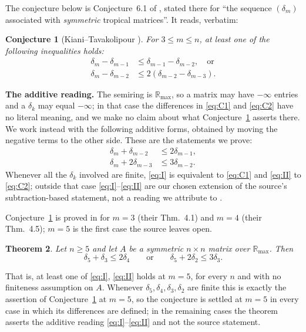 \documentclass[11pt]{amsart}
\newtheorem{theorem}{Theorem}
\newtheorem{conjecture}[theorem]{Conjecture}
\newcommand{\Rmax}{\mathbb R_{\max}}
\newcommand{\dd}{\delta}
\begin{document}
The conjecture below is Conjecture~6.1 of \cite{KT}, stated there for ``the
sequence $(\dd_m)$ associated with \emph{symmetric} tropical matrices''. It
reads, verbatim:

\begin{conjecture}[Kiani--Tavakolipour {\cite[Conj.~6.1]{KT}}]\label{conj:KT}
For $3\le m\le n$, at least one of the following inequalities holds:
\begin{align}
 \dd_m-\dd_{m-1}&\le\dd_{m-1}-\dd_{m-2},\quad\text{or}\label{eq:C1}\\
 \dd_m-\dd_{m-2}&\le2(\dd_{m-2}-\dd_{m-3}).\label{eq:C2}
\end{align}
\end{conjecture}

\medskip
\noindent\textbf{The additive reading.}
The semiring is $\Rmax$, so a matrix may have $-\infty$ entries and a $\dd_k$
may equal $-\infty$; in that case the differences in \eqref{eq:C1} and
\eqref{eq:C2} have no literal meaning, and we make no claim about what
Conjecture~\ref{conj:KT} asserts there. We work instead with the following
additive forms, obtained by moving the negative terms to the other side. These
are the statements we prove:
\begin{align}
 \dd_m+\dd_{m-2}&\le2\dd_{m-1},\label{eq:I}\tag{I}\\
 \dd_m+2\dd_{m-3}&\le3\dd_{m-2}.\label{eq:II}\tag{II}
\end{align}
Whenever all the $\dd_k$ involved are finite, \eqref{eq:I} is equivalent to
\eqref{eq:C1} and \eqref{eq:II} to \eqref{eq:C2}; outside that case
\eqref{eq:I}--\eqref{eq:II} are our chosen extension of the source's
subtraction-based statement, not a reading we attribute to \cite{KT}.

Conjecture~\ref{conj:KT} is proved in \cite{KT} for $m=3$ (their Thm.~4.1) and
$m=4$ (their Thm.~4.5); $m=5$ is the first case the source leaves open.

\begin{theorem}\label{thm:main}
Let $n\ge5$ and let $A$ be a symmetric $n\times n$ matrix over $\Rmax$. Then
\begin{equation*}
 \dd_5+\dd_3\le2\dd_4
 \qquad\text{or}\qquad
 \dd_5+2\dd_2\le3\dd_3 .
\end{equation*}
\end{theorem}

\noindent That is, at least one of \eqref{eq:I}, \eqref{eq:II} holds at $m=5$,
for every $n$ and with no finiteness assumption on $A$. Whenever
$\dd_5,\dd_4,\dd_3,\dd_2$ are finite this is exactly the assertion of
Conjecture~\ref{conj:KT} at $m=5$, so the conjecture is settled at $m=5$ in
every case in which its differences are defined; in the remaining cases the
theorem asserts the additive reading \eqref{eq:I}--\eqref{eq:II} and not the
source statement.
\end{document}
